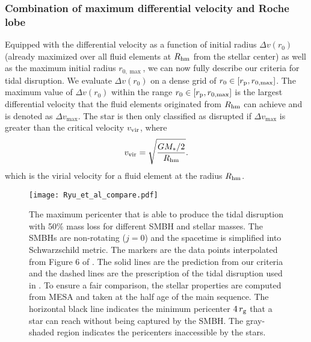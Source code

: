 \documentclass[useAMS,usenatbib]{mn2e}
\def\mstar{M_*}
\def\rg{r_{\rm g}}
\def\rp{r_{\rm p}}
\def\Rhm{R_{\rm hm}}
\begin{document}
\subsubsection{Combination of maximum differential velocity and Roche lobe}
Equipped with the differential velocity as a function of initial radius $\Delta v(r_0)$ (already maximized over all fluid elements at $R_{\rm hm}$ from the stellar center) as well as the maximum initial radius $r_{0,\max}$, we can now fully describe our criteria for tidal disruption. We evaluate $\Delta v(r_0)$ on a dense grid of $r_0\in [\rp, r_{\rm 0,max}]$. The maximum value of $\Delta v(r_0)$ within the range $r_0\in[\rp,r_{\rm 0,max}]$ is the largest differential velocity that the fluid elements originated from $\Rhm$ can achieve and is denoted as $\Delta v_{\max}$.
The star is then only classified as disrupted if $\Delta v_{\max}$ is greater than the critical velocity $v_{\rm vir}$, where
\begin{equation}\label{eq:virial_velocity}
    v_{\rm vir} = \sqrt{G\mstar/2\over \Rhm}.
\end{equation}
which is the virial velocity for a fluid element at the radius $\Rhm$.

\begin{figure}
    \centering
    \texttt{[image: Ryu\_et\_al\_compare.pdf]}
    \caption{
    The maximum pericenter that is able to produce the tidal disruption with 50\% mass loss for different SMBH and stellar masses.
    The SMBHs are non-rotating ($j=0$) and the spacetime is simplified into Schwarzschild metric.
    The markers are the data points interpolated from Figure 6 of \protect\cite{Ryu2020d}.
    The solid lines are the prediction from our criteria and the dashed lines are the prescription of the tidal disruption used in \protect\cite{Kesden2012}.
    To ensure a fair comparison, the stellar properties are computed from MESA
    and taken at the half age of the main sequence.
    The horizontal black line indicates the minimum pericenter $4\,\rg$ that a star can reach without being captured by the SMBH.
    The gray-shaded region indicates the pericenters inaccessible by the stars.
    }
    \label{fig:Ryu_et_al_compare}
\end{figure}
\end{document}
